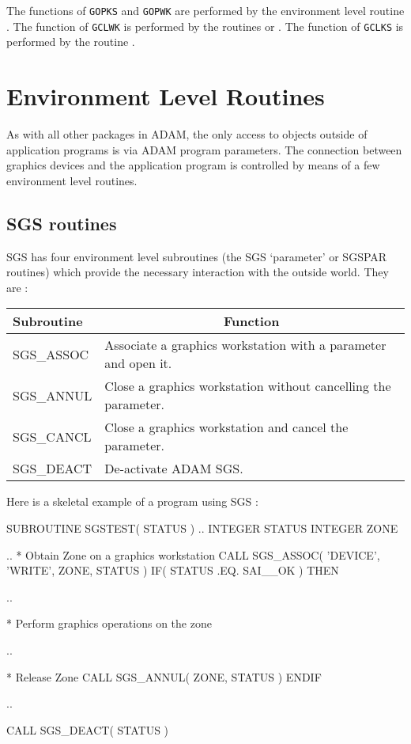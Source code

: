 \documentclass[twoside,11pt,nolof]{starlink}
\begin{document}
The functions of \texttt{GOPKS} and \texttt{GOPWK} are performed by the environment
level routine . The function of
\texttt{GCLWK} is performed by the routines
 or
. The function of \texttt{GCLKS}
is performed by the routine .

\section{Environment Level Routines}

As with all other packages in ADAM, the only access to objects outside of
application programs is via ADAM program parameters. The connection between
graphics devices and the application program is controlled by means of a few
environment level routines.

\subsection{SGS routines}

SGS has four environment level subroutines (the SGS `parameter' or SGSPAR
routines) which provide the necessary interaction with the outside world.
They are :

\begin{center}
\begin{tabular}{||l|l||} \hline
Subroutine & \multicolumn{1}{c||}{Function} \\ \hline
SGS\_ASSOC  & Associate a graphics workstation with a parameter and open it.\\
SGS\_ANNUL  & Close a graphics workstation without cancelling the parameter.\\
SGS\_CANCL  & Close a graphics workstation and cancel the parameter.\\
SGS\_DEACT  & De-activate ADAM SGS.\\ \hline
\end{tabular}
\end{center}

Here is a skeletal example of a program using SGS :
\begin{small}
\begin{terminalv}
      SUBROUTINE SGSTEST( STATUS )
      ..
      INTEGER STATUS
      INTEGER ZONE

      ..
*    Obtain Zone on a graphics workstation
      CALL SGS_ASSOC( 'DEVICE', 'WRITE', ZONE, STATUS )
      IF( STATUS .EQ. SAI__OK ) THEN

         ..

*       Perform graphics operations on the zone

         ..

*       Release Zone
         CALL SGS_ANNUL( ZONE, STATUS )
      ENDIF

      ..

      CALL SGS_DEACT( STATUS )

\end{terminalv}
\end{small}
\end{document}
